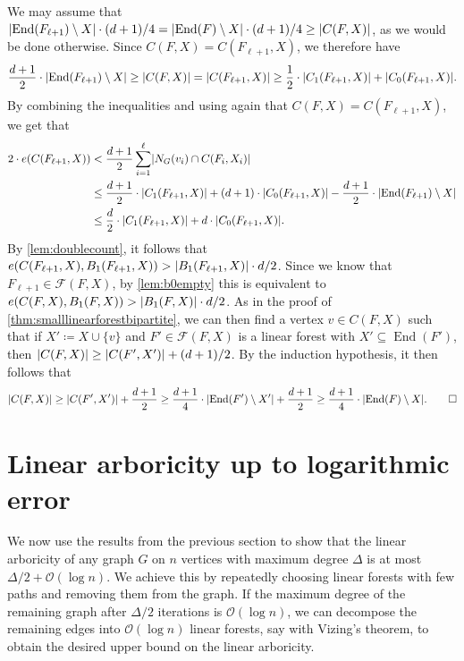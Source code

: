 \documentclass[11pt]{article}
\makeatletter
\theoremstyle{plain}
\theoremstyle{definition}
\renewenvironment{proof}[1][\proofname]
{\par\pushQED{\qed}
	\normalfont\topsep6\p@\@plus6\p@\relax\trivlist
	\item[\hskip\labelsep\bfseries#1\@addpunct{.}]
	\ignorespaces}
{\popQED\endtrivlist\@endpefalse}
\newcommand{\cO}{\mathcal O}
\newcommand{\cF}{\mathcal F}
\DeclarePairedDelimiter{\abs}{\lvert}{\rvert}
\DeclareMathOperator{\End}{End}
\makeatother
\begin{document}
\begin{proof}[Proof of \cref{prop:componentsize}]
    We may assume that $\abs{\End(F_{\ell+1}) \setminus X} \cdot (d+1)/4 = \abs{\End(F) \setminus X} \cdot (d+1)/4 \ge \abs{C(F,X)}$, as we would be done otherwise. Since $C(F,X) = C(F_{\ell+1},X)$, we therefore have
    \begin{equation}
        \frac{d+1}{2} \cdot \abs{\End(F_{\ell+1}) \setminus X} \ge \abs{C(F,X)} = \abs{C(F_{\ell+1},X)} \ge \frac{1}{2} \cdot \abs{C_1(F_{\ell+1},X)} + \abs{C_0(F_{\ell+1},X)}. \label{eq:endpointssizecomponent}
    \end{equation}
    By combining the inequalities  and using again that $C(F,X) = C(F_{\ell+1},X)$, we get that
    \begin{align*}
        2 \cdot e(C(F_{\ell+1},X)) & < \frac{d+1}{2} \sum_{i=1}^\ell \abs{N_G(v_i) \cap C(F_i,X_i)} \\
        & \le \frac{d+1}{2} \cdot \abs{C_1(F_{\ell+1},X)} + (d+1) \cdot \abs{C_0(F_{\ell+1},X)} - \frac{d+1}{2} \cdot \abs{\End(F_{\ell+1}) \setminus X} \\
        & \le \frac{d}{2} \cdot \abs{C_1(F_{\ell+1},X)} + d \cdot \abs{C_0(F_{\ell+1},X)}.
    \end{align*}
    By \cref{lem:doublecount}, it follows that $e(C(F_{\ell+1},X),B_1(F_{\ell+1},X)) > \abs{B_1(F_{\ell+1},X)} \cdot d/2$. Since we know that $F_{\ell+1} \in \cF(F,X)$, by \cref{lem:b0empty} this is equivalent to $e(C(F,X),B_1(F,X)) > \abs{B_1(F,X)} \cdot d/2$. As in the proof of \cref{thm:smalllinearforestbipartite}, we can then find a vertex $v \in C(F,X)$ such that if $X' \coloneqq X \cup \{v\}$ and $F' \in \cF(F,X)$ is a linear forest with $X' \subseteq \End(F')$, then $\abs{C(F,X)} \ge \abs{C(F',X')} + (d+1)/2$.
    By the induction hypothesis, it then follows that
    \[
        \abs{C(F,X)} \ge \abs{C(F',X')} + \frac{d+1}{2} \ge \frac{d+1}{4} \cdot \abs{\End(F') \setminus X'} + \frac{d+1}{2} \ge \frac{d+1}{4} \cdot \abs{\End(F) \setminus X}. \qedhere
    \]
\end{proof}

\section{Linear arboricity up to logarithmic error}\label{sec:lineararboricity}

We now use the results from the previous section to show that the linear arboricity of any graph $G$ on $n$ vertices with maximum degree $\Delta$ is at most $\Delta/2 + \cO(\log n)$. We achieve this by repeatedly choosing linear forests with few paths and removing them from the graph. If the maximum degree of the remaining graph after $\Delta/2$ iterations is $\cO(\log n)$, we can decompose the remaining edges into $\cO(\log n)$ linear forests, say with Vizing's theorem, to obtain the desired upper bound on the linear arboricity.
\end{document}
